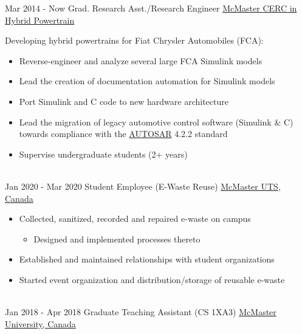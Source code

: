 \documentclass[letterpaper]{twentysecondcv} %
\begin{document}
\vspace{-.5em}
\begin{twenty} %
  \twentyitem
  {Mar 2014 -}
  {Now}
  {Grad. Research Asst./Research Engineer}
  {%
    \href{http://hybrid.mcmaster.ca/}{McMaster CERC in Hybrid Powertrain}}
  {}
  {Developing hybrid powertrains for Fiat Chrysler Automobiles (FCA):
    \begin{itemize}
      \item Reverse-engineer and analyze several large FCA Simulink models
      \item Lead the creation of documentation automation for Simulink models
      \item Port Simulink and C code to new hardware architecture
      \item Lead the migration of legacy automotive control software (Simulink \& C) towards compliance with the \href{https://www.autosar.org/standards/classic-platform/}{AUTOSAR} 4.2.2 standard
      \item Supervise undergraduate students (2+ years)
    \end{itemize}}
  \\
  \twentyitem
  {Jan 2020 -}
  {Mar 2020}
  {Student Employee (E-Waste Reuse)}
  {\href{https://uts.mcmaster.ca/}{McMaster UTS, Canada}}
  {}
  {\vspace{-.8em}\begin{itemize}
      \item Collected, sanitized, recorded and repaired e-waste on campus
      \begin{itemize}
        \item Designed and implemented processes thereto
      \end{itemize}
      \item Established and maintained relationships with student organizations
      \item Started event organization and distribution/storage of reusable e-waste
    \end{itemize}
  }
	\\
  \twentyitem
  {Jan 2018 -}
  {Apr 2018}
  {Graduate Teaching Assistant (CS 1XA3)}
  {\href{https://www.mcmaster.ca/}{McMaster University, Canada}}
  {}

\end{twenty}
\end{document}
